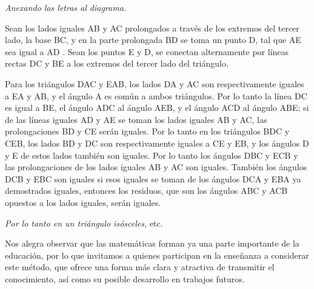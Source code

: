 \documentclass[booklanguage=english]{byrnebook}
\begin{document}
\qedNB

\begin{center}
\emph{Anexando las letras al diagrama.}
\end{center}

Sean los lados iguales AB y AC prolongados a través de los extremos del tercer lado, la base BC, y en la parte prolongada BD se toma un punto D, tal que AE sea igual a AD . Sean los puntos E y D, se conectan alternamente por líneas rectas DC y BE a los extremos del tercer lado del triángulo.

Para los triángulos DAC y EAB, los lados DA y AC son respectivamente iguales a EA y AB, y el ángulo A es común a ambos triángulos. Por lo tanto  la línea DC es igual a BE, el ángulo ADC al ángulo AEB, y el ángulo ACD al ángulo ABE; si de las líneas iguales AD y AE se toman los lados iguales AB y AC, las prolongaciones BD y CE serán iguales. Por lo tanto en los triángulos BDC y CEB, los lados BD y DC son respectivamente iguales a CE y EB, y los ángulos D y E de estos lados también son iguales. Por lo tanto  los ángulos DBC y ECB y las prolongaciones de los lados iguales AB y AC son iguales. También los ángulos DCB y EBC son iguales si esos iguales se toman de los ángulos DCA y EBA ya demostrados iguales, entonces los residuos, que son los ángulos ABC y ACB opuestos a los lados iguales, serán iguales.

\emph{Por lo tanto en un triángulo isósceles,} etc.

\qedNB

\pagebreak


Nos alegra observar que las matemáticas forman ya una parte importante de la educación, por lo que invitamos a quienes participan en la enseñanza a considerar este método, que ofrece una forma más clara y atractiva de transmitir el conocimiento, así como su posible desarrollo en trabajos futuros.

\end{document}
